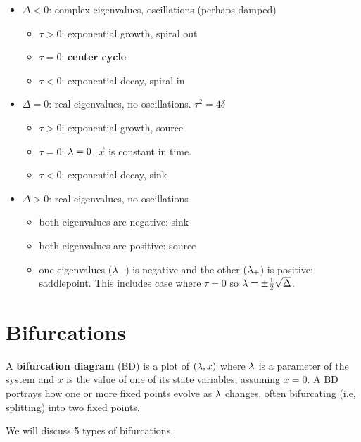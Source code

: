 \begin{itemize}
\item $\Delta < 0$:
complex eigenvalues,
oscillations (perhaps damped)
\begin{itemize}[\checkmark]
\item $\tau>0$: exponential growth, spiral out
\item $\tau=0$: {\bf center cycle}
\item $\tau<0$: exponential decay, spiral in
\end{itemize}


\item $\Delta = 0$:
real eigenvalues,
no oscillations. $\tau^2 = 4\delta$
\begin{itemize}[\checkmark]
\item $\tau>0$: exponential growth, source
\item $\tau=0$: $\lambda=0$, $\vec{x}$ is constant in time.
\item $\tau<0$: exponential decay, sink
\end{itemize}

\item $\Delta > 0$:
real eigenvalues,
no oscillations 

\begin{itemize}[\checkmark]
\item both eigenvalues are negative: sink
\item both eigenvalues are positive: source
\item one eigenvalues ($\lambda_-$) is negative 
and the other ($\lambda_+$) is positive: saddlepoint. This 
includes case where $\tau=0$ so $\lambda =\pm\frac{1}{2}\sqrt{\Delta}$.
\end{itemize}
\end{itemize}
\section{Bifurcations}

A {\bf bifurcation diagram}
(BD)
is a plot of $(\lambda, x)$
where $\lambda$ is
a parameter of the
system and $x$
is the value of one
of its  state
variables, assuming 
$\dot{x}=0$. A BD portrays
how one or more fixed points evolve
as $\lambda$ changes, often 
bifurcating (i.e, splitting) into two fixed points.

We will  discuss 5 types of bifurcations.

